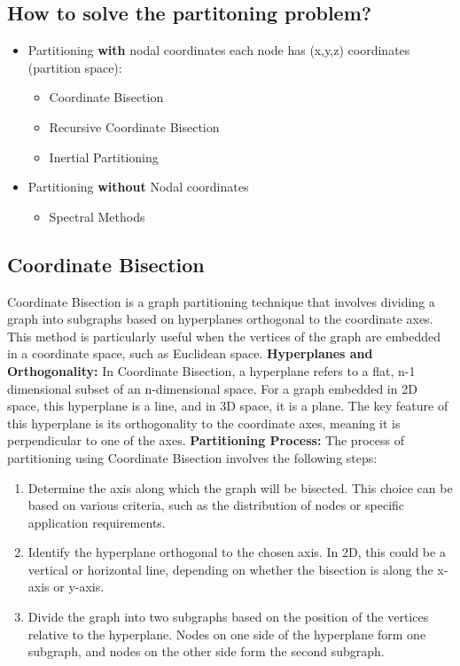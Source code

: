 \documentclass[unicode,11pt,a4paper,oneside,numbers=endperiod,openany]{scrartcl}
\begin{document}
\subsection{How to solve the partitoning problem?}

\begin{itemize}
 \item{Partitioning \textbf{with} nodal coordinates each node has (x,y,z) coordinates (partition space):}
	\begin{itemize}
	\item {Coordinate Bisection}
	\item {Recursive Coordinate Bisection}
	\item {Inertial Partitioning}
	\end{itemize}
	\item{ Partitioning \textbf{without} Nodal coordinates}
	\begin{itemize}
	\item {Spectral Methods}
	\end{itemize}
	\end{itemize}



\subsection{Coordinate Bisection}

Coordinate Bisection is a graph partitioning technique that involves dividing a graph into subgraphs based on hyperplanes orthogonal to the coordinate axes. This method is particularly useful when the vertices of the graph are embedded in a coordinate space, such as Euclidean space.
\newline \newline
\textbf{Hyperplanes and Orthogonality:}
In Coordinate Bisection, a hyperplane refers to a flat, n-1 dimensional subset of an n-dimensional space. For a graph embedded in 2D space, this hyperplane is a line, and in 3D space, it is a plane. The key feature of this hyperplane is its orthogonality to the coordinate axes, meaning it is perpendicular to one of the axes.
\newline \newline
\textbf{Partitioning Process:}
The process of partitioning using Coordinate Bisection involves the following steps:
\begin{enumerate}
    \item Determine the axis along which the graph will be bisected. This choice can be based on various criteria, such as the distribution of nodes or specific application requirements.
    \item Identify the hyperplane orthogonal to the chosen axis. In 2D, this could be a vertical or horizontal line, depending on whether the bisection is along the x-axis or y-axis.
    \item Divide the graph into two subgraphs based on the position of the vertices relative to the hyperplane. Nodes on one side of the hyperplane form one subgraph, and nodes on the other side form the second subgraph.
\end{enumerate}
\end{document}
